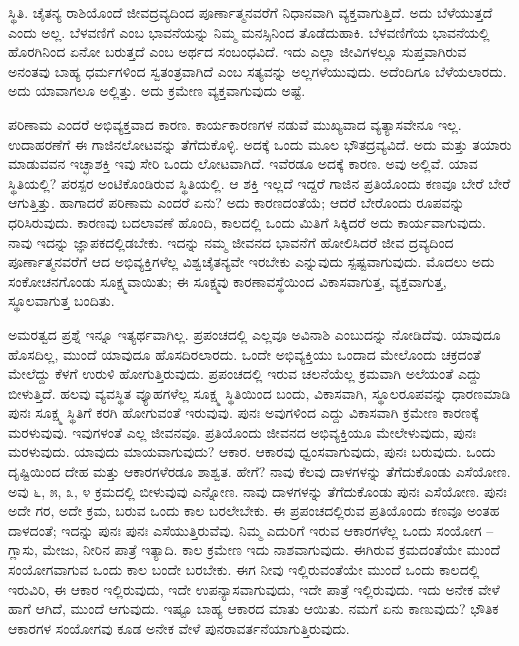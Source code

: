 ಸ್ಥಿತಿ. ಚೈತನ್ಯ ರಾಶಿಯೊಂದೆ ಜೀವದ್ರವ್ಯದಿಂದ ಪೂರ್ಣಾತ್ಮನವರೆಗೆ ನಿಧಾನವಾಗಿ ವ್ಯಕ್ತವಾಗುತ್ತಿದೆ. ಅದು ಬೆಳೆಯುತ್ತದೆ ಎಂದು ಅಲ್ಲ. ಬೆಳವಣಿಗೆ ಎಂಬ ಭಾವನೆಯನ್ನು ನಿಮ್ಮ ಮನಸ್ಸಿನಿಂದ ತೊಡೆದುಹಾಕಿ. ಬೆಳವಣಿಗೆಯ ಭಾವನೆಯಲ್ಲಿ ಹೊರಗಿನಿಂದ ಏನೋ ಬರುತ್ತದೆ ಎಂಬ ಅರ್ಥದ ಸಂಬಂಧವಿದೆ. ಇದು ಎಲ್ಲಾ ಜೀವಿಗಳಲ್ಲೂ ಸುಪ್ತವಾಗಿರುವ ಅನಂತವು ಬಾಹ್ಯ ಧರ್ಮಗಳಿಂದ ಸ್ವತಂತ್ರವಾಗಿದೆ ಎಂಬ ಸತ್ಯವನ್ನು ಅಲ್ಲಗಳೆಯುವುದು. ಅದೆಂದಿಗೂ ಬೆಳೆಯಲಾರದು. ಅದು ಯಾವಾಗಲೂ ಅಲ್ಲಿತ್ತು. ಅದು ಕ್ರಮೇಣ ವ್ಯಕ್ತವಾಗುವುದು ಅಷ್ಟೆ.

ಪರಿಣಾಮ ಎಂದರೆ ಅಭಿವ್ಯಕ್ತವಾದ ಕಾರಣ. ಕಾರ್ಯಕಾರಣಗಳ ನಡುವೆ ಮುಖ್ಯವಾದ ವ್ಯತ್ಯಾಸವೇನೂ ಇಲ್ಲ. ಉದಾಹರಣೆಗೆ ಈ ಗಾಜಿನಲೋಟವನ್ನು ತೆಗೆದುಕೊಳ್ಳಿ. ಅದಕ್ಕೆ ಒಂದು ಮೂಲ ಭೌತದ್ರವ್ಯವಿದೆ. ಅದು ಮತ್ತು ತಯಾರು ಮಾಡುವವನ ಇಚ್ಛಾಶಕ್ತಿ ಇವು ಸೇರಿ ಒಂದು ಲೋಟವಾಗಿದೆ. ಇವೆರಡೂ ಅದಕ್ಕೆ ಕಾರಣ. ಅವು ಅಲ್ಲಿವೆ. ಯಾವ ಸ್ಥಿತಿಯಲ್ಲಿ? ಪರಸ್ಪರ ಅಂಟಿಕೊಂಡಿರುವ ಸ್ಥಿತಿಯಲ್ಲಿ. ಆ ಶಕ್ತಿ ಇಲ್ಲದೆ ಇದ್ದರೆ ಗಾಜಿನ ಪ್ರತಿಯೊಂದು ಕಣವೂ ಬೇರೆ ಬೇರೆ ಆಗುತ್ತಿತ್ತು. ಹಾಗಾದರೆ ಪರಿಣಾಮ ಎಂದರೆ ಏನು? ಅದು ಕಾರಣದಂತೆಯೆ; ಆದರೆ ಬೇರೊಂದು ರೂಪವನ್ನು ಧರಿಸಿರುವುದು. ಕಾರಣವು ಬದಲಾವಣೆ ಹೊಂದಿ, ಕಾಲದಲ್ಲಿ ಒಂದು ಮಿತಿಗೆ ಸಿಕ್ಕಿದರೆ ಅದು ಕಾರ್ಯವಾಗುವುದು. ನಾವು ಇದನ್ನು ಜ್ಞಾಪಕದಲ್ಲಿಡಬೇಕು. ಇದನ್ನು ನಮ್ಮ ಜೀವನದ ಭಾವನೆಗೆ ಹೋಲಿಸಿದರೆ ಜೀವ ದ್ರವ್ಯದಿಂದ ಪೂರ್ಣಾತ್ಮನವರೆಗೆ ಆದ ಅಭಿವ್ಯಕ್ತಿಗಳೆಲ್ಲ ವಿಶ್ವಚೈತನ್ಯವೇ ಇರಬೇಕು ಎನ್ನುವುದು ಸ್ಪಷ್ಟವಾಗುವುದು. ಮೊದಲು ಅದು ಸಂಕೋಚನಗೊಂಡು ಸೂಕ್ಷ್ಮವಾಯಿತು; ಈ ಸೂಕ್ಷ್ಮವು ಕಾರಣಾವಸ್ಥೆಯಿಂದ ವಿಕಾಸವಾಗುತ್ತ, ವ್ಯಕ್ತವಾಗುತ್ತ, ಸ್ಥೂಲವಾಗುತ್ತ ಬಂದಿತು.

ಅಮರತ್ವದ ಪ್ರಶ್ನೆ ಇನ್ನೂ ಇತ್ಯರ್ಥವಾಗಿಲ್ಲ. ಪ್ರಪಂಚದಲ್ಲಿ ಎಲ್ಲವೂ ಅವಿನಾಶಿ ಎಂಬುದನ್ನು ನೋಡಿದೆವು. ಯಾವುದೂ ಹೊಸದಿಲ್ಲ, ಮುಂದೆ ಯಾವುದೂ ಹೊಸದಿರಲಾರದು. ಒಂದೇ ಅಭಿವ್ಯಕ್ತಿಯು ಒಂದಾದ ಮೇಲೊಂದು ಚಕ್ರದಂತೆ ಮೇಲೆದ್ದು ಕೆಳಗೆ ಉರುಳಿ ಹೋಗುತ್ತಿರುವುದು. ಪ್ರಪಂಚದಲ್ಲಿ ಇರುವ ಚಲನೆಯೆಲ್ಲ ಕ್ರಮವಾಗಿ ಅಲೆಯಂತೆ ಎದ್ದು ಬೀಳುತ್ತಿದೆ. ಹಲವು ವ್ಯವಸ್ಥಿತ ವ್ಯೂಹಗಳೆಲ್ಲ ಸೂಕ್ಷ್ಮ ಸ್ಥಿತಿಯಿಂದ ಬಂದು, ವಿಕಾಸವಾಗಿ, ಸ್ಥೂಲರೂಪವನ್ನು ಧಾರಣಮಾಡಿ ಪುನಃ ಸೂಕ್ಷ್ಮ ಸ್ಥಿತಿಗೆ ಕರಗಿ ಹೋಗುವಂತೆ ಇರುವುವು. ಪುನಃ ಅವುಗಳಿಂದ ಎದ್ದು ವಿಕಾಸವಾಗಿ ಕ್ರಮೇಣ ಕಾರಣಕ್ಕೆ ಮರಳುವುವು. ಇವುಗಳಂತೆ ಎಲ್ಲ ಜೀವನವೂ. ಪ್ರತಿಯೊಂದು ಜೀವನದ ಅಭಿವ್ಯಕ್ತಿಯೂ ಮೇಲೇಳುವುದು, ಪುನಃ ಮರಳುವುದು. ಯಾವುದು ಮಾಯವಾಗುವುದು? ಆಕಾರ. ಆಕಾರವು ಧ್ವಂಸವಾಗುವುದು, ಪುನಃ ಬರುವುದು. ಒಂದು ದೃಷ್ಟಿಯಿಂದ ದೇಹ ಮತ್ತು ಆಕಾರಗಳೆರಡೂ ಶಾಶ್ವತ. ಹೇಗೆ? ನಾವು ಕೆಲವು ದಾಳಗಳನ್ನು ತೆಗೆದುಕೊಂಡು ಎಸೆಯೋಣ. ಅವು ೬, ೫, ೩, ೪ ಕ್ರಮದಲ್ಲಿ ಬೀಳುವುವು ಎನ್ನೋಣ. ನಾವು ದಾಳಗಳನ್ನು ತೆಗೆದುಕೊಂಡು ಪುನಃ ಎಸೆಯೋಣ. ಪುನಃ ಅದೇ ಗರ, ಅದೇ ಕ್ರಮ, ಬರುವ ಒಂದು ಕಾಲ ಬರಲೇಬೇಕು. ಈ ಪ್ರಪಂಚದಲ್ಲಿರುವ ಪ್ರತಿಯೊಂದು ಕಣವೂ ಅಂತಹ ದಾಳದಂತೆ; ಇದನ್ನು ಪುನಃ ಪುನಃ ಎಸೆಯುತ್ತಿರುವೆವು. ನಿಮ್ಮ ಎದುರಿಗೆ ಇರುವ ಆಕಾರಗಳೆಲ್ಲ ಒಂದು ಸಂಯೋಗ – ಗ್ಲಾಸು, ಮೇಜು, ನೀರಿನ ಪಾತ್ರೆ ಇತ್ಯಾದಿ. ಕಾಲ ಕ್ರಮೇಣ ಇದು ನಾಶವಾಗುವುದು. ಈಗಿರುವ ಕ್ರಮದಂತೆಯೇ ಮುಂದೆ ಸಂಯೋಗವಾಗುವ ಒಂದು ಕಾಲ ಬಂದೇ ಬರಬೇಕು. ಈಗ ನೀವು ಇಲ್ಲಿರುವಂತೆಯೇ ಮುಂದೆ ಒಂದು ಕಾಲದಲ್ಲಿ ಇರುವಿರಿ, ಈ ಆಕಾರ ಇಲ್ಲಿರುವುದು, ಇದೇ ಉಪನ್ಯಾಸವಾಗುವುದು, ಇದೇ ಪಾತ್ರೆ ಇಲ್ಲಿರುವುದು. ಇದು ಅನೇಕ ವೇಳೆ ಹಾಗೆ ಆಗಿದೆ, ಮುಂದೆ ಆಗುವುದು. ಇಷ್ಟೂ ಬಾಹ್ಯ ಆಕಾರದ ಮಾತು ಆಯಿತು. ನಮಗೆ ಏನು ಕಾಣುವುದು? ಭೌತಿಕ ಆಕಾರಗಳ ಸಂಯೋಗವು ಕೂಡ ಅನೇಕ ವೇಳೆ ಪುನರಾವರ್ತನೆಯಾಗುತ್ತಿರುವುದು.

